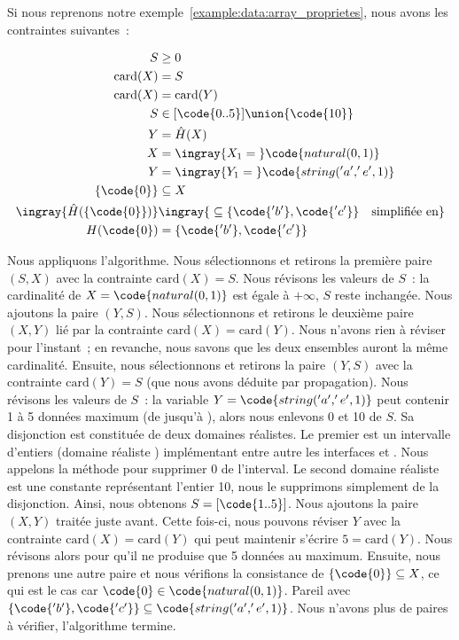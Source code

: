 \begin{example}

Si nous reprenons notre exemple~\ref{example:data:array_proprietes}, nous avons
les contraintes suivantes~:

\begin{align*}
%
S & \geq 0 \\
%
\mathrm{card}(X) & = S \\
%
\mathrm{card}(X) & = \mathrm{card}(Y) \\
%
S & \in [\code{0..5}] \union \{\code{10}\} \\
%
Y & = \hat{H}(X) \\
%
X & = \ingray{X_1 =\;} \code{natural(0, 1)} \\
%
Y & = \ingray{Y_1 =\;} \code{string('a', 'e', 1)} \\
%
\{\code{0}\} & \subseteq X \\
%
\ingray{\hat{H}(\{\code{0}\})} & \ingray{\;\subseteq \{\code{'b'}, \code{'c'}\}
                                 \quad \text{simplifiée en}} \\
%
H(\code{0}) & = \{\code{'b'}, \code{'c'}\}
%
\end{align*}

Nous appliquons l'algorithme. Nous sélectionnons et retirons la première paire
$(S, X)$ avec la contrainte $\mathrm{card}(X) = S$. Nous révisons les valeurs de
$S$~: la cardinalité de $X = \code{natural(0, 1)}$ est égale à $+\infty$, $S$
reste inchangée. Nous ajoutons la paire $(Y, S)$. Nous sélectionnons et retirons
le deuxième paire $(X, Y)$ lié par la contrainte $\mathrm{card}(X) =
\mathrm{card}(Y)$. Nous n'avons rien à réviser pour l'instant~; en revanche,
nous savons que les deux ensembles auront la même cardinalité. Ensuite, nous
sélectionnons et retirons la paire $(Y, S)$ avec la contrainte $\mathrm{card}(Y)
= S$ (que nous avons déduite par propagation). Nous révisons les valeurs de
$S$~: la variable $Y = \code{string('a', 'e', 1)}$ peut contenir 1 à 5 données
maximum (de  jusqu'à ), alors nous enlevons 0 et 10 de $S$. Sa
disjonction est constituée de deux domaines réalistes. Le premier est un
intervalle d'entiers (domaine réaliste ) implémentant entre
autre les interfaces  et . Nous appelons la
méthode  pour supprimer 0 de l'interval. Le second domaine
réaliste est une constante représentant l'entier 10, nous le supprimons
simplement de la disjonction. Ainsi, nous obtenons $S = [\code{1..5}]$. Nous
ajoutons la paire $(X, Y)$ traitée juste avant. Cette fois-ci, nous pouvons
réviser $Y$ avec la contrainte $\mathrm{card}(X) = \mathrm{card}(Y)$ qui peut
maintenir s'écrire $5 = \mathrm{card}(Y)$. Nous révisons alors  pour qu'il ne produise que 5 données au maximum. Ensuite, nous prenons une
autre paire et nous vérifions la consistance de $\{\code{0}\} \subseteq X$, ce
qui est le cas car $\code{0} \in \code{natural(0, 1)}$. Pareil avec
$\{\code{'b'}, \code{'c'}\} \subseteq \code{string('a', 'e', 1)}$. Nous n'avons
plus de paires à vérifier, l'algorithme termine.

\end{example}

